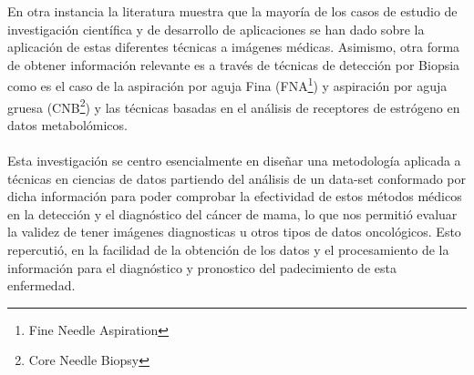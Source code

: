 En otra instancia la literatura muestra que la mayoría de los casos de estudio de investigación científica y de desarrollo de aplicaciones se han dado sobre la aplicación de estas diferentes técnicas a imágenes médicas. Asimismo, otra forma de obtener información relevante es a través de técnicas de detección por Biopsia como es el caso de la aspiración por aguja Fina (FNA\footnote{Fine Needle Aspiration}) y aspiración por aguja gruesa (CNB\footnote{Core Needle Biopsy}) y las técnicas basadas en el análisis de receptores de estrógeno en datos metabolómicos. 
\\\\
Esta investigación se centro esencialmente en diseñar una metodología aplicada a técnicas en ciencias de datos partiendo del análisis de un data-set conformado por dicha información para poder comprobar la efectividad de estos métodos médicos en la detección y el diagnóstico del cáncer de mama, lo que nos permitió evaluar la validez de tener imágenes diagnosticas u otros tipos de datos oncológicos. Esto repercutió, en la facilidad de la obtención de los datos y el procesamiento de la información para el diagnóstico y pronostico del padecimiento de esta enfermedad.
